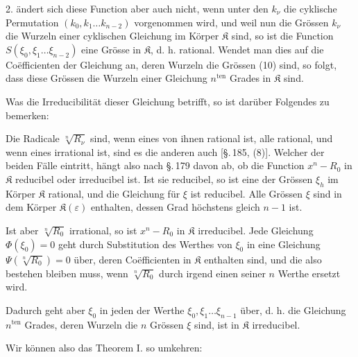 2. ändert sich diese Function aber auch nicht, wenn unter den $k_\nu$ die cyklische Permutation $(k_0, k_1 \ldots k_{n-2})$ vorgenommen wird, und weil nun die Grössen $k_\nu$ die Wurzeln einer cyklischen Gleichung im Körper $\mathfrak{K}$ sind, so ist die Function $S(\xi_0, \xi_1 \ldots \xi_{n-2})$ eine Grösse in $\mathfrak{K}$, d. h. rational. Wendet man dies auf die Coëfficienten der Gleichung an, deren Wurzeln die Grössen (10) sind, so folgt, dass diese Grössen die Wurzeln einer Gleichung $n^{\mathrm{ten}}$ Grades in $\mathfrak{K}$ sind.

Was die Irreducibilität dieser Gleichung betrifft, so ist darüber Folgendes zu bemerken:

Die Radicale $\sqrt[n]{R_\nu}$ sind, wenn eines von ihnen rational ist, alle rational, und wenn eines irrational ist, sind es die anderen auch [§.\,185, (8)]. Welcher der beiden Fälle eintritt, hängt also nach §.\,179 davon ab, ob die Function $x^n - R_0$ in $\mathfrak{K}$ reducibel oder irreducibel ist. Ist sie reducibel, so ist eine der Grössen $\xi_h$ im Körper $\mathfrak{K}$ rational, und die Gleichung für $\xi$ ist reducibel. Alle Grössen $\xi$ sind in dem Körper $\mathfrak{K}(\varepsilon)$ enthalten, dessen Grad höchstens gleich $n-1$ ist.

Ist aber $\sqrt[n]{R_0}$ irrational, so ist $x^n - R_0$ in $\mathfrak{K}$ irreducibel. Jede Gleichung $\Phi(\xi_0) = 0$ geht durch Substitution des Werthes von $\xi_0$ in eine Gleichung $\Psi\!\left(\sqrt[n]{R_0}\right) = 0$ über, deren Coëfficienten in $\mathfrak{K}$ enthalten sind, und die also bestehen bleiben muss, wenn $\sqrt[n]{R_0}$ durch irgend einen seiner $n$ Werthe ersetzt wird.

Dadurch geht aber $\xi_0$ in jeden der Werthe $\xi_0, \xi_1 \ldots \xi_{n-1}$ über, d. h. die Gleichung $n^{\mathrm{ten}}$ Grades, deren Wurzeln die $n$ Grössen $\xi$ sind, ist in $\mathfrak{K}$ irreducibel.

Wir können also das Theorem I. so umkehren:

